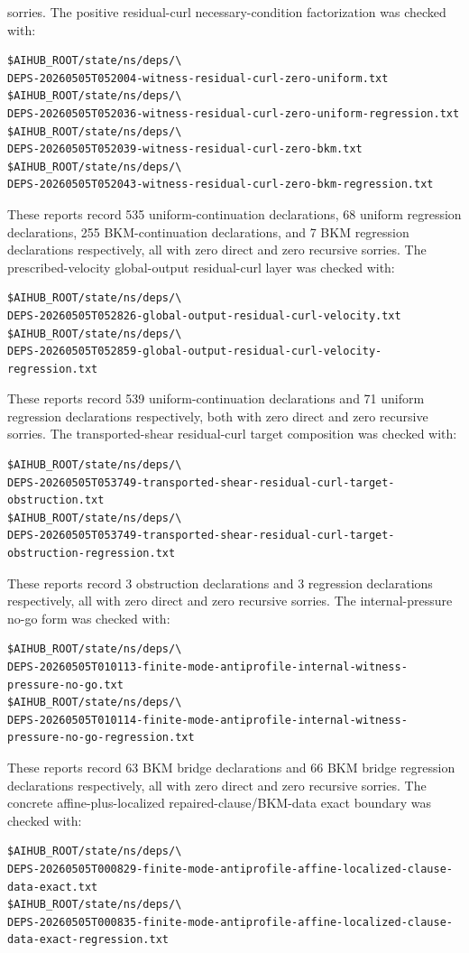 \documentclass[11pt]{article}
\begin{document}
sorries.
The positive residual-curl necessary-condition factorization was checked with:
\begin{verbatim}
$AIHUB_ROOT/state/ns/deps/\
DEPS-20260505T052004-witness-residual-curl-zero-uniform.txt
$AIHUB_ROOT/state/ns/deps/\
DEPS-20260505T052036-witness-residual-curl-zero-uniform-regression.txt
$AIHUB_ROOT/state/ns/deps/\
DEPS-20260505T052039-witness-residual-curl-zero-bkm.txt
$AIHUB_ROOT/state/ns/deps/\
DEPS-20260505T052043-witness-residual-curl-zero-bkm-regression.txt
\end{verbatim}
These reports record 535 uniform-continuation declarations, 68 uniform
regression declarations, 255 BKM-continuation declarations, and 7 BKM
regression declarations respectively, all with zero direct and zero recursive
sorries.
The prescribed-velocity global-output residual-curl layer was checked with:
\begin{verbatim}
$AIHUB_ROOT/state/ns/deps/\
DEPS-20260505T052826-global-output-residual-curl-velocity.txt
$AIHUB_ROOT/state/ns/deps/\
DEPS-20260505T052859-global-output-residual-curl-velocity-regression.txt
\end{verbatim}
These reports record 539 uniform-continuation declarations and 71 uniform
regression declarations respectively, both with zero direct and zero recursive
sorries.
The transported-shear residual-curl target composition was checked with:
\begin{verbatim}
$AIHUB_ROOT/state/ns/deps/\
DEPS-20260505T053749-transported-shear-residual-curl-target-obstruction.txt
$AIHUB_ROOT/state/ns/deps/\
DEPS-20260505T053749-transported-shear-residual-curl-target-obstruction-regression.txt
\end{verbatim}
These reports record 3 obstruction declarations and 3 regression declarations
respectively, all with zero direct and zero recursive sorries.
The internal-pressure no-go form was checked with:
\begin{verbatim}
$AIHUB_ROOT/state/ns/deps/\
DEPS-20260505T010113-finite-mode-antiprofile-internal-witness-pressure-no-go.txt
$AIHUB_ROOT/state/ns/deps/\
DEPS-20260505T010114-finite-mode-antiprofile-internal-witness-pressure-no-go-regression.txt
\end{verbatim}
These reports record 63 BKM bridge declarations and 66 BKM bridge regression
declarations respectively, all with zero direct and zero recursive sorries.
The concrete affine-plus-localized repaired-clause/BKM-data exact boundary was
checked with:
\begin{verbatim}
$AIHUB_ROOT/state/ns/deps/\
DEPS-20260505T000829-finite-mode-antiprofile-affine-localized-clause-data-exact.txt
$AIHUB_ROOT/state/ns/deps/\
DEPS-20260505T000835-finite-mode-antiprofile-affine-localized-clause-data-exact-regression.txt
\end{verbatim}
\end{document}

